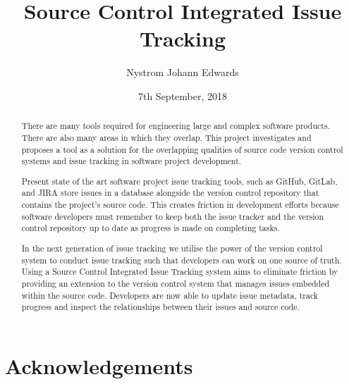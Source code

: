 \documentclass{mproj}
\begin{document}
\title{Source Control Integrated Issue Tracking}
\author{Nystrom Johann Edwards}
\date{7th September, 2018}
\maketitle

\begin{abstract}
There are many tools required for engineering large and complex software products. There are also many areas in which they overlap. This project investigates and proposes a tool as a solution for the overlapping qualities of source code version control systems and issue tracking in software project development. 

Present state of the art software project issue tracking tools, such as GitHub, GitLab, and JIRA store issues in a database alongside the version control repository that contains the project's source code. This creates friction in development efforts because software developers must remember to keep both the issue tracker and the version control repository up to date as progress is made on completing tasks.

In the next generation of issue tracking we utilise the power of the version control system to conduct issue tracking such that developers can work on one source of truth. Using a Source Control Integrated Issue Tracking system aims to eliminate friction by providing an extension to the version control system that manages issues embedded within the source code. Developers are now able to update issue metadata, track progress and inspect the relationships between their issues and source code.  %
\end{abstract}

\educationalconsent


\newpage
\section*{Acknowledgements}
\end{document}
